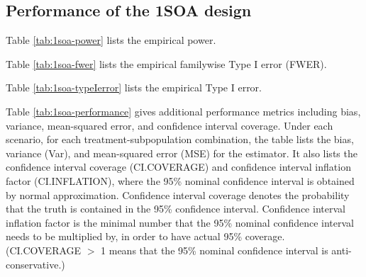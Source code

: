 \documentclass{article}\usepackage[]{graphicx}\usepackage[]{color}
\makeatletter
\newenvironment{kframe}{%
 \def\at@end@of@kframe{}%
 \ifinner\ifhmode%
  \def\at@end@of@kframe{\end{minipage}}%
  \begin{minipage}{\columnwidth}%
 \fi\fi%
 \def\FrameCommand##1{\hskip\@totalleftmargin \hskip-\fboxsep
 \colorbox{shadecolor}{##1}\hskip-\fboxsep
     \hskip-\linewidth \hskip-\@totalleftmargin \hskip\columnwidth}%
 \MakeFramed {\advance\hsize-\width
   \@totalleftmargin\z@ \linewidth\hsize
   \@setminipage}}%
 {\par\unskip\endMakeFramed%
 \at@end@of@kframe}
\numberwithin{table}{section}
\numberwithin{figure}{section}
\makeatother
\begin{document}
\begin{kframe}


{\ttfamily\noindent\bfseries\color{errorcolor}{\#\# Error in matrix(osoa.result\$parameters\$alpha.allocation * ui.total.alpha, : object 'osoa.result' not found}}

{\ttfamily\noindent\bfseries\color{errorcolor}{\#\# Error in data.frame(Stage = 1:nrow(alpha.allocation), alpha.allocation): arguments imply differing number of rows: 2, 0}}\end{kframe}


\subsection{Performance of the 1SOA design}


Table \ref{tab:1soa-power} lists the empirical power.

Table \ref{tab:1soa-fwer} lists the empirical familywise Type I error (FWER).

Table \ref{tab:1soa-typeIerror} lists the empirical Type I error.

Table \ref{tab:1soa-performance} gives additional performance metrics including bias, variance, mean-squared error, and confidence interval coverage. Under each scenario, for each treatment-subpopulation combination, the table lists the bias, variance (Var), and mean-squared error (MSE) for the estimator. It also lists the confidence interval coverage (CI.COVERAGE) and confidence interval inflation factor (CI.INFLATION), where the 95\% nominal confidence interval is obtained by normal approximation. Confidence interval coverage denotes the probability that the truth is contained in the 95\% confidence interval. Confidence interval inflation factor is the minimal number that the 95\% nominal confidence interval needs to be multiplied by, in order to have actual 95\% coverage. (CI.COVERAGE $>$ 1 means that the 95\% nominal confidence interval is anti-conservative.)

\begin{kframe}


{\ttfamily\noindent\bfseries{}}

{\ttfamily\noindent\bfseries\color{errorcolor}{\#\# Error in cbind(osoa.result\$optima\$empirical.power, osoa.result\$optima\$conj.power): object 'osoa.result' not found}}

{\ttfamily\noindent\bfseries\color{errorcolor}{\#\# Error in names(x) <- value: 'names' attribute [1] must be the same length as the vector [0]}}

{\ttfamily\noindent\bfseries\color{errorcolor}{\#\# Error in data.frame(Scenario = 1:n.scenarios, my.table): arguments imply differing number of rows: 1, 0}}\end{kframe}
\end{document}

